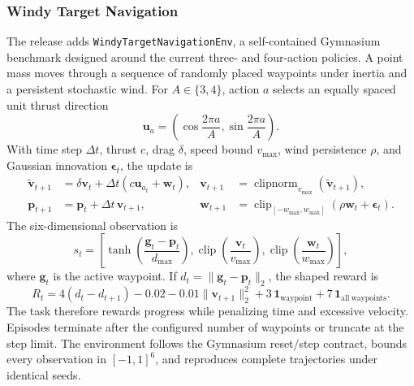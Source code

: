 \documentclass[10pt]{article}
\newcommand{\code}[1]{\texttt{#1}}
\begin{document}
\subsubsection{Windy Target Navigation}
\label{sec:windy-navigation}

The release adds \code{WindyTargetNavigationEnv}, a self-contained Gymnasium
benchmark designed around the current three- and four-action policies.  A point
mass moves through a sequence of randomly placed waypoints under inertia and a
persistent stochastic wind.  For $A\in\{3,4\}$, action $a$ selects an equally
spaced unit thrust direction
\begin{equation}
  \bm u_a=
  \left(\cos\frac{2\pi a}{A},\sin\frac{2\pi a}{A}\right).
  \label{eq:windy-action}
\end{equation}
With time step $\Delta t$, thrust $c$, drag $\delta$, speed bound $v_{\max}$,
wind persistence $\rho$, and Gaussian innovation $\bm\epsilon_t$, the update is
\begin{align}
  \widetilde{\bm v}_{t+1}
    &=\delta\bm v_t+\Delta t(c\bm u_{a_t}+\bm w_t),
  &\bm v_{t+1}&=\operatorname{clipnorm}_{v_{\max}}
                     (\widetilde{\bm v}_{t+1}),\nonumber\\
  \bm p_{t+1}&=\bm p_t+\Delta t\,\bm v_{t+1},
  &\bm w_{t+1}&=\operatorname{clip}_{[-w_{\max},w_{\max}]}
                    (\rho\bm w_t+\bm\epsilon_t).
  \label{eq:windy-dynamics}
\end{align}
The six-dimensional observation is
\begin{equation}
  s_t=\left[
  \tanh\!\left(\frac{\bm g_t-\bm p_t}{d_{\max}}\right),
  \operatorname{clip}\!\left(\frac{\bm v_t}{v_{\max}}\right),
  \operatorname{clip}\!\left(\frac{\bm w_t}{w_{\max}}\right)
  \right],
  \label{eq:windy-observation}
\end{equation}
where $\bm g_t$ is the active waypoint.  If
$d_t=\|\bm g_t-\bm p_t\|_2$, the shaped reward is
\begin{equation}
  R_t=4(d_t-d_{t+1})-0.02-0.01\|\bm v_{t+1}\|_2^2
      +3\,\mathbf 1_{\mathrm{waypoint}}
      +7\,\mathbf 1_{\mathrm{all\ waypoints}}.
  \label{eq:windy-reward}
\end{equation}
The task therefore rewards progress while penalizing time and excessive
velocity.  Episodes terminate after the configured number of waypoints or
truncate at the step limit.  The environment follows the Gymnasium reset/step
contract, bounds every observation in $[-1,1]^6$, and reproduces complete
trajectories under identical seeds.
\end{document}
